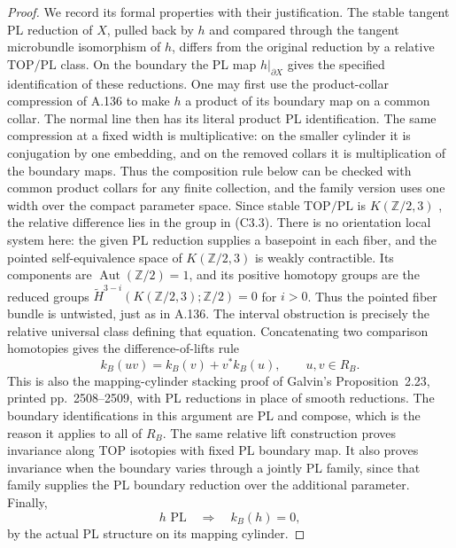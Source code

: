 \begin{proof}
We record its formal properties with their justification. The stable
tangent PL reduction of $X$, pulled back by $h$ and compared through
the tangent microbundle isomorphism of $h$, differs from the original
reduction by a relative $\mathrm{TOP}/\mathrm{PL}$ class. On the
boundary the PL map $h|_{\partial X}$ gives the specified identification
of these reductions. One may first use the product-collar compression
of A.136 to make $h$ a product of its boundary map on a common collar.
The normal line then has its literal product PL identification. The
same compression at a fixed width is multiplicative: on the smaller
cylinder it is conjugation by one embedding, and on the removed collars
it is multiplication of the boundary maps. Thus the composition rule
below can be checked with common product collars for any finite
collection, and the family version uses one width over the compact
parameter space. Since stable $\mathrm{TOP}/\mathrm{PL}$ is
$K(\mathbb Z/2,3)$
\cite[Essay V, Theorem~5.5(I), printed p.~251]{KirbySiebenmann1977},
the relative difference lies in the group in (C3.3). There is no
orientation local system here: the given PL reduction supplies a
basepoint in each fiber, and the pointed self-equivalence space of
$K(\mathbb Z/2,3)$ is weakly contractible. Its components are
$\operatorname{Aut}(\mathbb Z/2)=1$, and its positive homotopy groups
are the reduced groups
$\widetilde H^{3-i}(K(\mathbb Z/2,3);\mathbb Z/2)=0$ for $i>0$.
Thus the pointed fiber bundle is untwisted, just as in A.136.
The interval obstruction is precisely the relative universal
class defining that equation. Concatenating two comparison homotopies
gives the difference-of-lifts rule
\[
             k_B(uv)=k_B(v)+v^*k_B(u),\qquad u,v\in R_B.
                                                        \tag{C3.4}
\]
This is also the mapping-cylinder stacking proof of Galvin's
Proposition~2.23, printed pp.~2508--2509, with PL reductions in place
of smooth reductions. The boundary identifications in this argument
are PL and compose, which is the reason it applies to all of $R_B$.
The same relative lift construction proves invariance along TOP
isotopies with fixed PL boundary map. It also proves invariance when
the boundary varies through a jointly PL family, since that family
supplies the PL boundary reduction over the additional parameter.
Finally,
\[
                 h\text{ PL}\quad\Longrightarrow\quad k_B(h)=0,
                                                        \tag{C3.5}
\]
by the actual PL structure on its mapping cylinder.


\end{proof}
